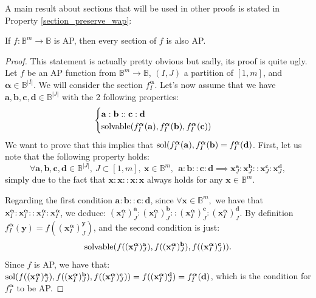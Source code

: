 A main result about sections that will be used in other proofs is stated in
Property \ref{section_preserve_wap}:

\begin{property}\label{section_preserve_wap}
If $f\colon \mathbb{B}^m\to \mathbb{B}$ is AP, then every section of $f$ is
  also AP.
\end{property}
\begin{proof}
  This statement is actually pretty obvious but sadly, its proof is quite ugly.
  Let $f$ be an AP function from $\mathbb{B}^m \to \mathbb{B}$, $(I,J)$
  a partition of $[1, m]$, and $\boldsymbol{\alpha} \in \mathbb{B}^{|I|}$. We
  will consider the section  $f^{\boldsymbol{\alpha}}_I$.  Let's now assume
  that we have $\mathbf{a},\mathbf{b},\mathbf{c}, \mathbf{d} \in
  \mathbb{B}^{|J|}$ with the 2 following properties:
  $$
  \begin{cases}
    \mathbf{a}:\mathbf{b}::\mathbf{c}:\mathbf{d}\\
    \text{solvable}(f^{\boldsymbol{\alpha}}_I(\mathbf{a}),f^{\boldsymbol{\alpha}}_I(\mathbf{b}),f^{\boldsymbol{\alpha}}_I(\mathbf{c}))
  \end{cases}
  $$
  We want to prove that this implies that
  $\text{sol}(f^{\boldsymbol{\alpha}}_I(\mathbf{a}),f^{\boldsymbol{\alpha}}_I(\mathbf{b})
  = f^{\boldsymbol{\alpha}}_I(\mathbf{d})$.
  First, let us note that the following property holds:
$$\forall \mathbf{a},\mathbf{b},\mathbf{c}, \mathbf{d} \in \mathbb{B}^{|J|},~J
  \subset [1,m], ~ \mathbf{x} \in \mathbb{B}^m,~~ \mathbf{a}: \mathbf{b} ::
  \mathbf{c} : \mathbf{d} \implies \mathbf{x}^{\mathbf{a}}_J :
  \mathbf{x}^{\mathbf{b}}_J:: \mathbf{x}^{\mathbf{c}}_J :
  \mathbf{x}^{\mathbf{d}}_J,$$
  simply due to the fact that $\mathbf{x}:\mathbf{x}::\mathbf{x}:\mathbf{x}$
  always holds for any $\mathbf{x} \in \mathbb{B}^m$.

Regarding the first condition $\mathbf{a}:\mathbf{b}::\mathbf{c}:\mathbf{d}$,
since $\forall \mathbf{x} \in \mathbb{B}^m,$ we have that $
  \mathbf{x}^{\boldsymbol{\alpha}}_I : \mathbf{x}^{\boldsymbol{\alpha}}_I ::
  \mathbf{x}^{\boldsymbol{\alpha}}_I : \mathbf{x}^{\boldsymbol{\alpha}}_I$, we
  deduce: $(\mathbf{x}^{\boldsymbol{\alpha}}_I)^{\mathbf{a}}_J :
  (\mathbf{x}^{\boldsymbol{\alpha}}_I)^{\mathbf{b}}_J ::
  (\mathbf{x}^{\boldsymbol{\alpha}}_I)^{\mathbf{c}}_J :
  (\mathbf{x}^{\boldsymbol{\alpha}}_I)^{\mathbf{d}}_J$.
By definition $f^{\boldsymbol{\boldsymbol{\alpha}}}_I(\mathbf{y}) =
  f((\mathbf{x}^{\boldsymbol{\alpha}}_I)^{\mathbf{y}}_J)$, and the second
  condition is just:
  $$\text{solvable}(f((\mathbf{x}^{\boldsymbol{\alpha}}_I)^\mathbf{a}_J),f((\mathbf{x}^{\boldsymbol{\alpha}}_I)^\mathbf{b}_J),f((\mathbf{x}^{\boldsymbol{\alpha}}_I)^\mathbf{c}_J)).$$
  Since $f$ is AP, we have that:
  $\text{sol}(f((\mathbf{x}^{\boldsymbol{\alpha}}_I)^\mathbf{a}_J),f((\mathbf{x}^{\boldsymbol{\alpha}}_I)^\mathbf{b}_J),f((\mathbf{x}^{\boldsymbol{\alpha}}_I)^\mathbf{c}_J))=
  f((\mathbf{x}^{\boldsymbol{\alpha}}_I)^\mathbf{d}_J)=f^{\boldsymbol{\alpha}}_I(\mathbf{d})$,
  which is the condition for  $f^{\boldsymbol{\boldsymbol{\alpha}}}_I$ to be
  AP.
\end{proof}


